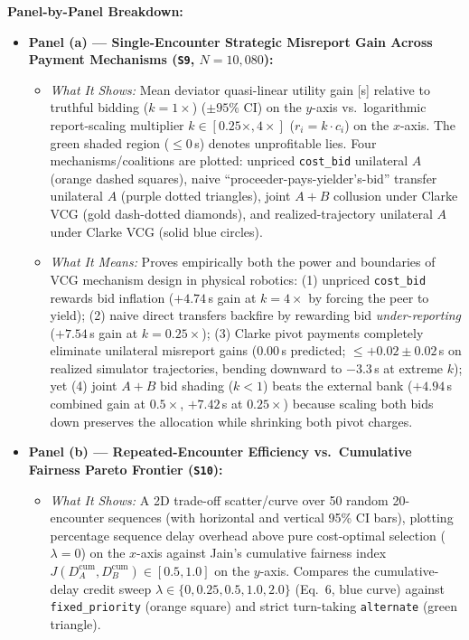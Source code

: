 \documentclass[10pt,a4paper]{article}
\begin{document}
\textbf{Panel-by-Panel Breakdown:}
\begin{itemize}
  \item \textbf{Panel (a) --- Single-Encounter Strategic Misreport Gain Across Payment Mechanisms (\texttt{S9}, $N=10{,}080$):}
  \begin{itemize}
    \item \emph{What It Shows:} Mean deviator quasi-linear utility gain [s] relative to truthful bidding ($k=1\times$) ($\pm 95\%$ CI) on the $y$-axis vs.\ logarithmic report-scaling multiplier $k\in[0.25\times, 4\times]$ ($r_i = k\cdot c_i$) on the $x$-axis. The green shaded region ($\le 0$\,s) denotes unprofitable lies. Four mechanisms/coalitions are plotted: unpriced \texttt{cost\_bid} unilateral $A$ (orange dashed squares), naive ``proceeder-pays-yielder's-bid'' transfer unilateral $A$ (purple dotted triangles), joint $A+B$ collusion under Clarke VCG (gold dash-dotted diamonds), and realized-trajectory unilateral $A$ under Clarke VCG (solid blue circles).
    \item \emph{What It Means:} Proves empirically both the power and boundaries of VCG mechanism design in physical robotics: (1) unpriced \texttt{cost\_bid} rewards bid inflation ($+4.74$\,s gain at $k=4\times$ by forcing the peer to yield); (2) naive direct transfers backfire by rewarding bid \emph{under-reporting} ($+7.54$\,s gain at $k=0.25\times$); (3) Clarke pivot payments completely eliminate unilateral misreport gains ($0.00$\,s predicted; $\le +0.02\pm 0.02$\,s on realized simulator trajectories, bending downward to $-3.3$\,s at extreme $k$); yet (4) joint $A+B$ bid shading ($k<1$) beats the external bank ($+4.94$\,s combined gain at $0.5\times$, $+7.42$\,s at $0.25\times$) because scaling both bids down preserves the allocation while shrinking both pivot charges.
  \end{itemize}
  \item \textbf{Panel (b) --- Repeated-Encounter Efficiency vs.\ Cumulative Fairness Pareto Frontier (\texttt{S10}):}
  \begin{itemize}
    \item \emph{What It Shows:} A 2D trade-off scatter/curve over 50 random 20-encounter sequences (with horizontal and vertical 95\% CI bars), plotting percentage sequence delay overhead above pure cost-optimal selection ($\lambda=0$) on the $x$-axis against Jain's cumulative fairness index $J(D_A^{\mathrm{cum}}, D_B^{\mathrm{cum}})\in[0.5,1.0]$ on the $y$-axis. Compares the cumulative-delay credit sweep $\lambda\in\{0, 0.25, 0.5, 1.0, 2.0\}$ (Eq.~6, blue curve) against \texttt{fixed\_priority} (orange square) and strict turn-taking \texttt{alternate} (green triangle).

\end{itemize}
\end{itemize}
\end{document}
